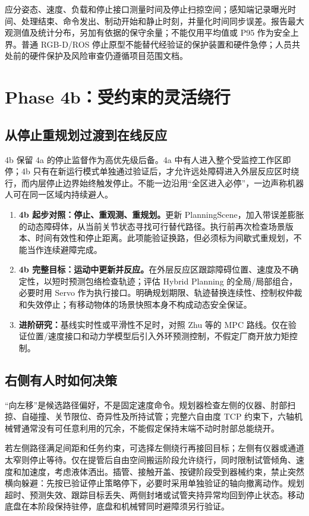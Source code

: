 应分姿态、速度、负载和停止接口测量时间及停止扫掠空间；感知端记录曝光时间、处理结束、命令发出、制动开始和静止时刻，并量化时间同步误差。报告最大观测值及统计分布，另加有依据的保守余量；不能仅用平均值或 P95 作为安全上界。普通 RGB-D/ROS 停止原型不能替代经验证的保护装置和硬件急停；人员共处前的硬件保护及风险审查仍遵循项目范围文档。

\section{Phase 4b：受约束的灵活绕行}

\subsection{从停止重规划过渡到在线反应}

4b 保留 4a 的停止监督作为高优先级后备。4a 中有人进入整个受监控工作区即停；4b 只有在新运行模式单独通过验证后，才允许远处障碍进入外层反应区时绕行，而内层停止边界始终触发停止。不能一边沿用“全区进入必停”，一边声称机器人可在同一区域内持续避人。

\begin{enumerate}
  \item \textbf{4b 起步对照：停止、重观测、重规划。}更新 PlanningScene，加入带误差膨胀的动态障碍体，从当前关节状态寻找可行替代路径。执行前再次检查场景版本、时间有效性和停止距离。此项能验证换路，但必须标为间歇式重规划，不能当作连续避障完成。
  \item \textbf{4b 完整目标：运动中更新并反应。}在外层反应区跟踪障碍位置、速度及不确定性，以短时预测包络检查轨迹；评估 Hybrid Planning 的全局/局部组合，必要时用 Servo 作为执行接口。明确规划期限、轨迹替换连续性、控制权仲裁和失效停止；有移动物体的场景快照本身不构成动态安全保证。
  \item \textbf{进阶研究：}基线实时性或平滑性不足时，对照 Zhu 等的 MPC 路线\cite{zhu2024dynamic}。仅在验证位置/速度接口和动力学模型后引入外环预测控制，不假定厂商开放力矩控制。
\end{enumerate}

\subsection{右侧有人时如何决策}

“向左移”是候选路径偏好，不是固定速度命令。规划器检查左侧的仪器、肘部扫掠、自碰撞、关节限位、奇异性及所持试管；完整六自由度 TCP 约束下，六轴机械臂通常没有可任意利用的冗余，不能假定保持末端不动时肘部总能绕开。

若左侧路径满足间距和任务约束，可选择左侧绕行再接回目标；左侧有仪器或通道太窄则停止等待。仅在提管后自由空间搬运阶段允许绕行，同时限制试管倾角、速度和加速度，考虑液体洒出。插管、接触开盖、按键阶段受到器械约束，禁止突然横向躲避：先按已验证停止策略停下，必要时采用单独验证的轴向撤离动作。规划超时、预测失效、跟踪目标丢失、两侧封堵或试管夹持异常均回到停止状态。移动底盘在本阶段保持驻停，底盘和机械臂同时避障须另行验证。

